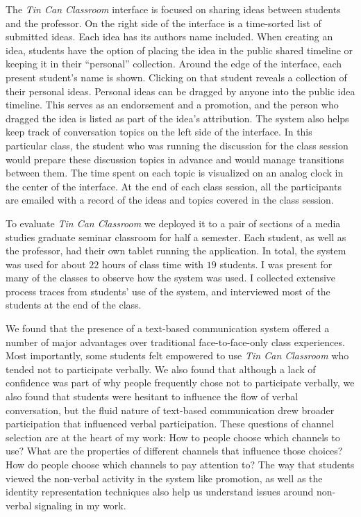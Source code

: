 \documentclass{tufte-handout}
\begin{document}
The \emph{Tin Can Classroom} interface is focused on sharing ideas between students and the professor. On the right side of the interface is a time-sorted list of submitted ideas. Each idea has its authors name included. When creating an idea, students have the option of placing the idea in the public shared timeline or keeping it in their ``personal'' collection. Around the edge of the interface, each present student's name is shown. Clicking on that student reveals a collection of their personal ideas. Personal ideas can be dragged by anyone into the public idea timeline. This serves as an endorsement and a promotion, and the person who dragged the idea is listed as part of the idea's attribution. The system also helps keep track of conversation topics on the left side of the interface. In this particular class, the student who was running the discussion for the class session would prepare these discussion topics in advance and would manage transitions between them. The time spent on each topic is visualized on an analog clock in the center of the interface. At the end of each class session, all the participants are emailed with a record of the ideas and topics covered in the class session.

To evaluate \emph{Tin Can Classroom} we deployed it to a pair of sections of a media studies graduate seminar classroom for half a semester. Each student, as well as the professor, had their own tablet running the application. In total, the system was used for about $22$ hours of class time with $19$ students. I was present for many of the classes to observe how the system was used. I collected extensive process traces from students' use of the system, and interviewed most of the students at the end of the class.

We found that the presence of a text-based communication system offered a number of major advantages over traditional face-to-face-only class experiences. Most importantly, some students felt empowered to use \emph{Tin Can Classroom} who tended not to participate verbally. We also found that although a lack of confidence was part of why people frequently chose not to participate verbally, we also found that students were hesitant to influence the flow of verbal conversation, but the fluid nature of text-based communication drew broader participation that influenced verbal participation. These questions of channel selection are at the heart of my work: How to people choose which channels to use? What are the properties of different channels that influence those choices? How do people choose which channels to pay attention to? The way that students viewed the non-verbal activity in the system like promotion, as well as the identity representation techniques also help us understand issues around non-verbal signaling in my work.
\end{document}
